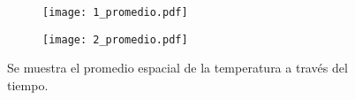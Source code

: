 \documentclass[a4paper]{article}
\begin{document}
	\begin{figure}
		\centering
		\begin{subfigure}{\textwidth}
			\centering
			\texttt{[image: 1\_promedio.pdf]}
			\caption{\label{fig:1_promedio}}
		\end{subfigure}
		\begin{subfigure}{\textwidth}
			\centering
			\texttt{[image: 2\_promedio.pdf]}
			\caption{\label{fig:2_promedio}}
			\end{subfigure}
		\caption{\label{fig:Tvs.t} Se muestra el promedio espacial de la temperatura a trav\'es del tiempo.}
	\end{figure}
\end{document}
